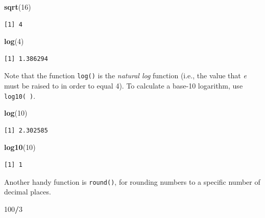 \documentclass[
]{book}
\newenvironment{Shaded}{\begin{snugshade}}{\end{snugshade}}
\newcommand{\DecValTok}[1]{\textcolor[rgb]{0.00,0.00,0.81}{#1}}
\newcommand{\KeywordTok}[1]{\textcolor[rgb]{0.13,0.29,0.53}{\textbf{#1}}}
\newcommand{\NormalTok}[1]{#1}
\newcommand{\OperatorTok}[1]{\textcolor[rgb]{0.81,0.36,0.00}{\textbf{#1}}}
\begin{document}
\begin{Shaded}
\begin{Highlighting}[]
\KeywordTok{sqrt}\NormalTok{(}\DecValTok{16}\NormalTok{)}
\end{Highlighting}
\end{Shaded}

\begin{verbatim}
[1] 4
\end{verbatim}

\begin{Shaded}
\begin{Highlighting}[]
\KeywordTok{log}\NormalTok{(}\DecValTok{4}\NormalTok{)}
\end{Highlighting}
\end{Shaded}

\begin{verbatim}
[1] 1.386294
\end{verbatim}

Note that the function \texttt{log()} is the \emph{natural log} function (i.e., the value that \emph{e} must be raised to in order to equal 4). To calculate a base-10 logarithm, use \texttt{log10(\ )}.

\begin{Shaded}
\begin{Highlighting}[]
\KeywordTok{log}\NormalTok{(}\DecValTok{10}\NormalTok{)}
\end{Highlighting}
\end{Shaded}

\begin{verbatim}
[1] 2.302585
\end{verbatim}

\begin{Shaded}
\begin{Highlighting}[]
\KeywordTok{log10}\NormalTok{(}\DecValTok{10}\NormalTok{)}
\end{Highlighting}
\end{Shaded}

\begin{verbatim}
[1] 1
\end{verbatim}

Another handy function is \texttt{round()}, for rounding numbers to a specific number of decimal places.

\begin{Shaded}
\begin{Highlighting}[]
\DecValTok{100}\OperatorTok{/}\DecValTok{3}
\end{Highlighting}
\end{Shaded}
\end{document}
